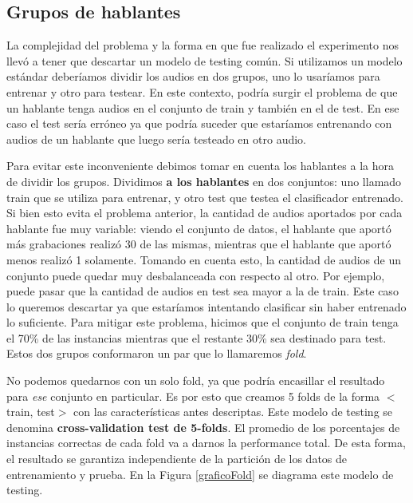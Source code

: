 
\subsection{Grupos de hablantes}


La complejidad del problema y la forma en que fue realizado el experimento nos llevó a tener que descartar un modelo de testing común. Si utilizamos un modelo estándar deberíamos dividir los audios en dos grupos, uno lo usaríamos para entrenar y otro para testear. En este contexto, podría surgir el problema de que un hablante tenga audios en el conjunto de train y también en el de test. En ese caso el test sería erróneo ya que podría suceder que estaríamos entrenando con audios de un hablante que luego sería testeado en otro audio.

Para evitar este inconveniente debimos tomar en cuenta los hablantes a la hora de dividir los grupos. Dividimos \textbf{a los hablantes} en dos conjuntos: uno llamado train que se utiliza para entrenar, y otro test que testea el clasificador entrenado. Si bien esto evita el problema anterior, la cantidad de audios aportados por cada hablante fue muy variable: viendo el conjunto de datos, el hablante que aportó más grabaciones realizó 30 de las mismas, mientras que el hablante que aportó menos realizó 1 solamente. Tomando en cuenta esto, la cantidad de audios de un conjunto puede quedar muy desbalanceada con respecto al otro. Por ejemplo, puede pasar que la cantidad de audios en test sea mayor a la de train. Este caso lo queremos descartar ya que estaríamos intentando clasificar sin haber entrenado lo suficiente. Para mitigar este problema, hicimos que el conjunto de train tenga el 70\% de las instancias mientras que el restante 30\% sea destinado para test. Estos dos grupos conformaron un par que lo llamaremos \textit{fold}.

No podemos quedarnos con un solo fold, ya que podría encasillar el resultado para \textit{ese} conjunto en particular. Es por esto que creamos 5 folds de la forma $<$train, test$>$ con las características antes descriptas. Este modelo de testing se denomina \textbf{cross-validation test de 5-folds}. El promedio de los porcentajes de instancias correctas de cada fold va a darnos la performance total. De esta forma, el resultado se garantiza independiente de la partición de los datos de entrenamiento y prueba. En la Figura \ref{graficoFold} se diagrama este modelo de testing.

